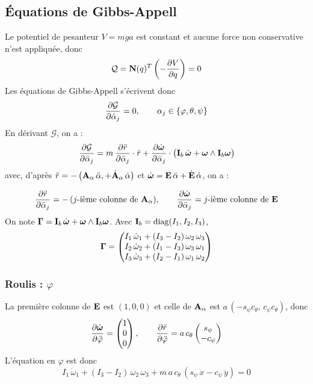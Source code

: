 \subsection{Équations de Gibbs-Appell}

Le potentiel de pesanteur $V = m g a$ est constant et aucune force non
conservative n'est appliquée, donc
\[
    \mathcal{Q} = \mathbf{N}(q)^T\left(-\frac{\partial V}{\partial q}\right) = 0
\]
Les équations de Gibbs-Appell s'écrivent donc
\[
    \frac{\partial \mathcal{G}}{\partial \ddot\alpha_j} = 0,
    \qquad \alpha_j\in\{\varphi,\theta,\psi\}
\]
En dérivant $\mathcal{G}$, on a : 
\[
    \frac{\partial \mathcal{G}}{\partial \ddot\alpha_j}
    = m\,\frac{\partial \ddot r}{\partial \ddot\alpha_j}\cdot\ddot r
    + \frac{\partial \dot{\bm{\omega}}}{\partial \ddot\alpha_j}\cdot
    \bigl(\mathbf{I}_b\,\dot{\bm{\omega}}
    + \bm{\omega}\wedge\mathbf{I}_b\bm{\omega}\bigr)
\]
avec, d'après $\ddot r = -\,\bigl(\mathbf{A}_\alpha\,\ddot\alpha,
    + \dot{\mathbf{A}}_\alpha\,\dot\alpha\bigr)$ et $\dot{\bm{\omega}} = \mathbf{E}\,\ddot\alpha + \dot{\mathbf{E}}\,\dot\alpha$, on a : 

\[
    \frac{\partial \ddot r}{\partial \ddot\alpha_j} = -\,(\text{$j$-ième colonne de }
    \mathbf{A}_\alpha),
    \qquad
    \frac{\partial \dot{\bm{\omega}}}{\partial \ddot\alpha_j} = \text{$j$-ième colonne
    de } \mathbf{E}
\]
On note $\bm{\Gamma} = \mathbf{I}_b\,\dot{\bm{\omega}}
+ \bm{\omega}\wedge\mathbf{I}_b\bm{\omega}$. Avec
$\mathbf{I}_b = \mathrm{diag}(I_1,I_2,I_3)$,
\[
    \bm{\Gamma} = \begin{pmatrix}
        I_1\,\dot\omega_1 + (I_3 - I_2)\,\omega_2\,\omega_3\\
        I_2\,\dot\omega_2 + (I_1 - I_3)\,\omega_3\,\omega_1\\
        I_3\,\dot\omega_3 + (I_2 - I_1)\,\omega_1\,\omega_2
    \end{pmatrix}
\]

\subsubsection{Roulis : \texorpdfstring{$\varphi$}{phi}}

La première colonne de $\mathbf{E}$ est $(1,0,0)$ et celle de
$\mathbf{A}_\alpha$ est $a\,(-s_\psi c_\theta,\, c_\psi c_\theta)$, donc
\[
    \frac{\partial \dot{\bm{\omega}}}{\partial \ddot\varphi} = \begin{pmatrix}
        1\\ 0\\ 0
    \end{pmatrix},
    \qquad
    \frac{\partial \ddot r}{\partial \ddot\varphi} = a\,c_\theta\begin{pmatrix}
        s_\psi\\ -c_\psi
    \end{pmatrix}
\]
L'équation en $\varphi$ est donc
\[
    I_1\,\dot\omega_1 + (I_3 - I_2)\,\omega_2\,\omega_3
    + m\,a\,c_\theta\,(s_\psi\,\ddot x - c_\psi\,\ddot y) = 0
\]

